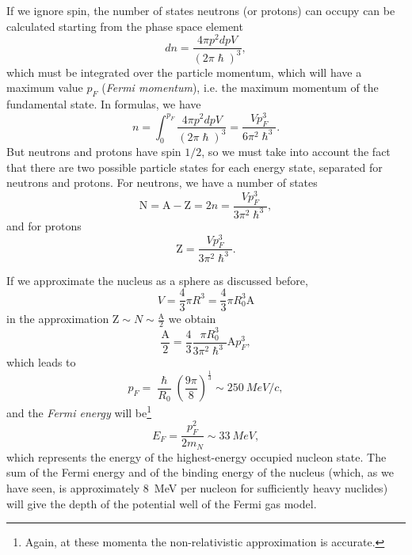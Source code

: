 If we ignore spin, the number of states neutrons (or protons) can occupy can be calculated starting from the phase space element
\begin{equation*}
    dn = \frac{4\pi p^2dpV}{(2\pi\hslash)^3},
\end{equation*}
which must be integrated over the particle momentum, which will have a maximum value $p_F$ (\emph{Fermi momentum}), i.e. the maximum momentum of the fundamental state. In formulas, we have
\begin{equation*}
    n = \int_0^{p_F} \frac{4\pi p^2 dp V}{(2\pi\hslash)^3} = \frac{Vp_F^3}{6\pi^2\hslash^3}.
\end{equation*}
But neutrons and protons have spin \(1/2\), so we must take into account the fact that there are two possible particle states for each energy state, separated for neutrons and protons. For neutrons, we have a number of states
\begin{equation*}
    \mbox{N} = \mbox{A} - \mbox{Z} = 2n = \frac{Vp_F^3}{3\pi^2\hslash^3},
\end{equation*}
and for protons
\begin{equation*}
    \mbox{Z} = \frac{Vp_F^3}{3\pi^2\hslash ^3}.
\end{equation*}

If we approximate the nucleus as a sphere as discussed before, 
\begin{equation*}
    V = \frac{4}{3}\pi R^3 = \frac{4}{3}\pi R^3_0 \mbox{A}
\end{equation*}
in the approximation $\mbox{Z} \sim N \sim \frac{\mbox{A}}{2}$ we obtain
\begin{equation*}
    \frac{\mbox{A}}{2} = \frac{4}{3}\frac{\pi R^3_0}{3\pi^2\hslash^3}\mbox{A}p_F^3,
\end{equation*}
which leads to
\begin{equation*}
    p_F = \frac{\hslash}{R_0}\left(\frac{9\pi}{8}\right)^{\frac{1}{3}}\sim \SI{250}{MeV/c},
\end{equation*}
and the \emph{Fermi energy} will be\footnote{Again, at these momenta the non-relativistic approximation is accurate.}
\begin{equation*}
    E_{F} = \frac{p_F^2}{2m_N} \sim \SI{33}{MeV},
\end{equation*}
which represents the energy of the highest-energy occupied nucleon state. The sum of the Fermi energy and of the binding energy of the nucleus (which, as we have seen, is approximately \SI{8}{MeV} per nucleon for sufficiently heavy nuclides) will give the depth of the potential well of the Fermi gas model.

